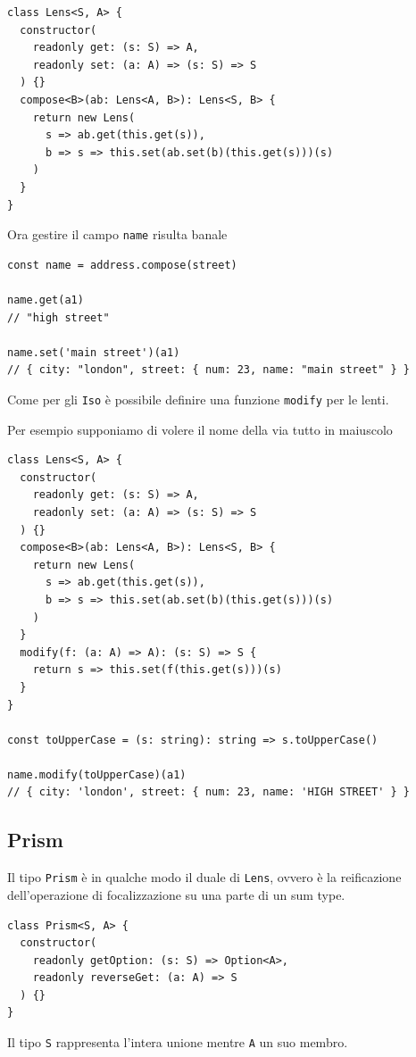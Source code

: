 \documentclass[12pt]{article}
\begin{document}
\begin{verbatim}
class Lens<S, A> {
  constructor(
    readonly get: (s: S) => A,
    readonly set: (a: A) => (s: S) => S
  ) {}
  compose<B>(ab: Lens<A, B>): Lens<S, B> {
    return new Lens(
      s => ab.get(this.get(s)),
      b => s => this.set(ab.set(b)(this.get(s)))(s)
    )
  }
}
\end{verbatim}

Ora gestire il campo \texttt{name} risulta banale

\begin{verbatim}
const name = address.compose(street)

name.get(a1)
// "high street"

name.set('main street')(a1)
// { city: "london", street: { num: 23, name: "main street" } }
\end{verbatim}

Come per gli \texttt{Iso} è possibile definire una funzione \texttt{modify} per le lenti.

Per esempio supponiamo di volere il nome della via tutto in maiuscolo

\begin{verbatim}
class Lens<S, A> {
  constructor(
    readonly get: (s: S) => A,
    readonly set: (a: A) => (s: S) => S
  ) {}
  compose<B>(ab: Lens<A, B>): Lens<S, B> {
    return new Lens(
      s => ab.get(this.get(s)),
      b => s => this.set(ab.set(b)(this.get(s)))(s)
    )
  }
  modify(f: (a: A) => A): (s: S) => S {
    return s => this.set(f(this.get(s)))(s)
  }
}

const toUpperCase = (s: string): string => s.toUpperCase()

name.modify(toUpperCase)(a1)
// { city: 'london', street: { num: 23, name: 'HIGH STREET' } }
\end{verbatim}

\subsection{Prism}

Il tipo \texttt{Prism} è in qualche modo il duale di \texttt{Lens}, ovvero è la reificazione dell'operazione di focalizzazione
su una parte di un sum type.

\begin{verbatim}
class Prism<S, A> {
  constructor(
    readonly getOption: (s: S) => Option<A>,
    readonly reverseGet: (a: A) => S
  ) {}
}
\end{verbatim}

Il tipo \texttt{S} rappresenta l'intera unione mentre \texttt{A} un suo membro.
\end{document}
